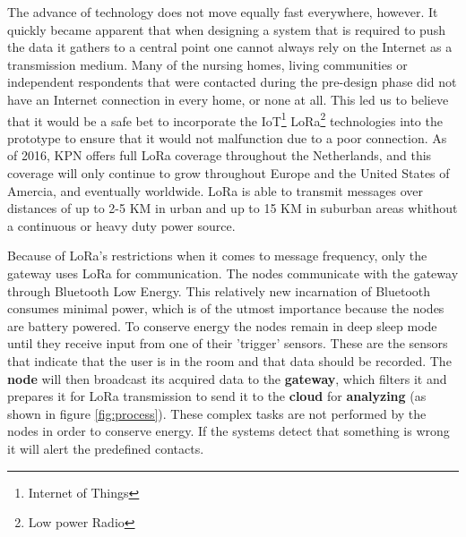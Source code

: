 \documentclass{below-ext}
\begin{document}
The advance of technology does not move equally fast everywhere, however. It quickly became apparent that when designing a system that is required to push the data it gathers to a central point one cannot always rely on the Internet as a transmission medium. Many of the nursing homes, living communities or independent respondents that were contacted during the pre-design phase did not have an Internet connection in every home, or none at all. This led us to believe that it would be a safe bet to incorporate the IoT\footnote{Internet of Things} LoRa\footnote{Low power Radio} technologies into the prototype to ensure that it would not malfunction due to a poor connection. As of 2016, KPN offers full LoRa coverage throughout the Netherlands, and this coverage will only continue to grow throughout Europe and the United States of Amercia, and eventually worldwide. LoRa is able to transmit messages over distances of up to 2-5 KM in urban and up to 15 KM in suburban areas whithout a continuous or heavy duty power source\cite{Adelantado:2016aa}.

Because of LoRa's restrictions when it comes to message frequency, only the gateway uses LoRa for communication. The nodes communicate with the gateway through Bluetooth Low Energy. This relatively new incarnation of Bluetooth consumes minimal power, which is of the utmost importance because the nodes are battery powered.\cite{s120911734} To conserve energy the nodes remain in deep sleep mode until they receive input from one of their  'trigger' sensors. These are the sensors that indicate that the user is in the room and that data should be recorded. The \textbf{node} will then broadcast its acquired data to the \textbf{gateway}, which filters it and prepares it for LoRa transmission to send it to the \textbf{cloud} for \textbf{analyzing} (as shown in figure \ref{fig:process}). These complex tasks are not performed by the nodes in order to conserve energy. If the systems detect that something is wrong it will alert the predefined contacts.
\end{document}
